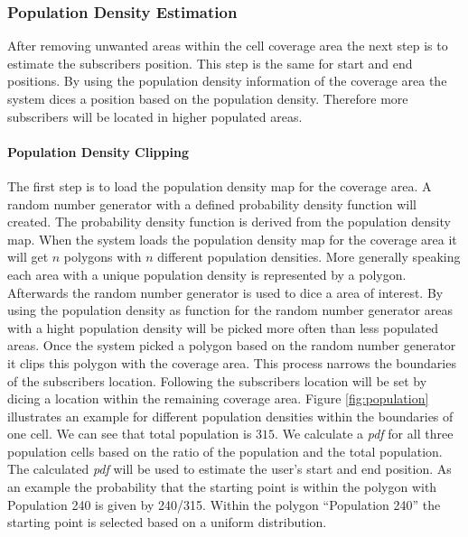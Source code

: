 \documentclass[master,english]{hgbthesis}
\begin{document}
\subsubsection{Population Density Estimation}
After removing unwanted areas within the cell coverage area the next step is to estimate the subscribers position. This step is the same for start and end positions. By using the population density information of the coverage area the system dices a position based on the population density. Therefore more subscribers will be located in higher populated areas.
\paragraph{Population Density Clipping}
The first step is to load the population density map for the coverage area. A random number generator with a defined probability density function will created. The probability density function is derived from the population density map. When the system loads the population density map for the coverage area it will get $n$ polygons with $n$ different population densities. More generally speaking each area with a unique population density is represented by a polygon. Afterwards the random number generator is used to dice a area of interest. By using the population density as function for the random number generator areas with a hight population density will be picked more often than less populated areas. Once the system picked a polygon based on the random number generator it clips this polygon with the coverage area. This process narrows the boundaries of the subscribers location. Following the subscribers location will be set by dicing a location within the remaining coverage area. Figure \ref{fig:population} illustrates an example for different population densities within the boundaries of one cell. We can see that total population is $315$. We calculate a \emph{pdf} for all three population cells based on the ratio of the population and the total population. The calculated \emph{pdf} will be used to estimate the user's start and end position. As an example the probability that the starting point is within the polygon with Population 240 is given by 240/315. Within the polygon ``Population 240'' the starting point is selected based on a uniform distribution. 
\end{document}
